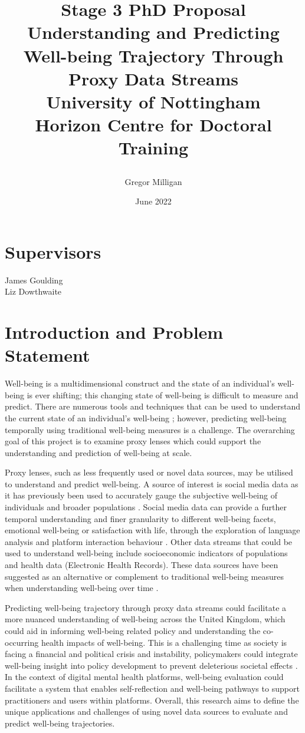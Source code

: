 \documentclass[12pt]{article}
\title{
    
    {Stage 3 PhD Proposal}\\
    {Understanding and Predicting Well-being Trajectory Through Proxy Data Streams}\\
    {\large University of Nottingham}\\
    {\large Horizon Centre for Doctoral Training}\\
}
\author{Gregor Milligan}
\date{June 2022}
\begin{document}
\maketitle
\section*{Supervisors}
James Goulding\\
Liz Dowthwaite

\tableofcontents
\clearpage
\section{Introduction and Problem Statement}

Well-being is a multidimensional construct and the state of an individual’s well-being is ever shifting; this changing state of well-being is difficult to measure and predict. There are numerous tools and techniques that can be used to understand the current state of an individual’s well-being \parencite{clarke_warwick-edinburgh_2011, diener_new_2010, watermanQuestionnaireEudaimonicWellBeing2010}; however, predicting well-being temporally using traditional well-being measures is a challenge. The overarching goal of this project is to examine proxy lenses which could support the understanding and prediction of well-being at scale. 

Proxy lenses, such as less frequently used or novel data sources, may be utilised to understand and predict well-being. A source of interest is social media data as it has previously been used to accurately gauge the subjective well-being of individuals and broader populations \parencite{jaidka_estimating_2020}. Social media data can provide a further temporal understanding and finer granularity to different well-being facets, emotional well-being or satisfaction with life, through the exploration of language analysis and platform interaction behaviour \parencite{luhmann_using_2017}. Other data streams that could be used to understand well-being include socioeconomic indicators of populations and health data (Electronic Health Records). These data sources have been suggested as an alternative or complement to traditional well-being measures when understanding well-being over time \parencite{voukelatou_measuring_2021}.
 
Predicting well-being trajectory through proxy data streams could facilitate a more nuanced understanding of well-being across the United Kingdom, which could aid in informing well-being related policy and understanding the co-occurring health impacts of well-being. This is a challenging time as society is facing a financial and political crisis and instability, policymakers could integrate well-being insight into policy development to prevent deleterious societal effects \parencite{voukelatou_measuring_2021}. In the context of digital mental health platforms, well-being evaluation could facilitate a system that enables self-reflection and well-being pathways to support practitioners and users within platforms. Overall, this research aims to define the unique applications and challenges of using novel data sources to evaluate and predict well-being trajectories.
\end{document}
